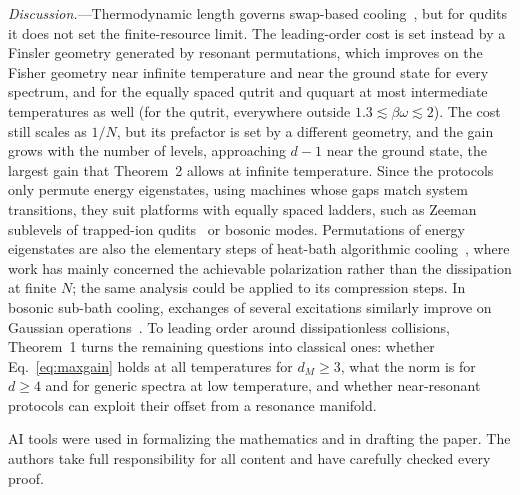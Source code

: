 \documentclass[aps,prl,reprint,superscriptaddress,amsmath,amssymb]{revtex4-2}
\begin{document}
\emph{Discussion.}---Thermodynamic length governs swap-based cooling~\cite{Taranto2025}, but for qudits it does not set
the finite-resource limit. The leading-order cost is set instead by a Finsler geometry generated by resonant
permutations, which improves on the Fisher geometry near infinite temperature and near the ground state for every
spectrum, and for the equally spaced qutrit and ququart at most intermediate temperatures as well (for the qutrit,
everywhere outside $1.3\lesssim\beta\omega\lesssim2$). The cost still scales as $1/N$, but its prefactor is set by a
different geometry, and the gain grows with the number of levels, approaching $d-1$ near the ground state, the largest
gain that Theorem~2 allows at infinite temperature. Since the protocols only permute energy eigenstates, using machines
whose gaps match system transitions, they suit platforms with equally spaced ladders, such as Zeeman sublevels of
trapped-ion qudits~\cite{Ringbauer2022} or bosonic modes. Permutations of energy eigenstates are also the elementary
steps of heat-bath algorithmic cooling~\cite{Boykin2002,RaeisiMosca2015}, where work has mainly concerned the
achievable polarization rather than the dissipation at finite $N$; the same analysis could be applied to its
compression steps. In bosonic sub-bath cooling, exchanges of several excitations similarly improve on Gaussian
operations~\cite{Png2026}. To leading order around dissipationless collisions, Theorem~1 turns the remaining questions
into classical ones: whether Eq.~\eqref{eq:maxgain} holds at all temperatures for $d_M\geq3$, what the norm is for
$d\geq4$ and for generic spectra at low temperature, and whether near-resonant protocols can exploit their offset from
a resonance manifold.

\begin{acknowledgments}
AI tools were used in formalizing the mathematics and in drafting the paper. The authors take full responsibility for
all content and have carefully checked every proof.
\end{acknowledgments}
\end{document}
